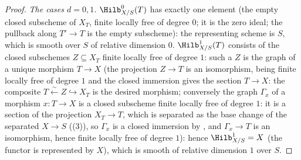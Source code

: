 \begin{proof}
\emph{The cases $d=0,1$.}  $\Hilb^0_{X/S}(T)$ has exactly one element
(the empty closed subscheme of $X_T$, finite locally free of degree
$0$; it is the zero ideal; the pullback along $T'\to T$ is the empty
subscheme): the representing scheme is $S$, which is smooth over $S$
of relative dimension $0$.  $\Hilb^1_{X/S}(T)$ consists of the closed
subschemes $Z\subseteq X_T$ finite locally free of degree $1$: such a
$Z$ is the graph of a unique morphism $T\to X$ (the projection
$Z\to T$ is an isomorphism, being finite locally free of degree $1$
and the closed immersion gives the section $T\to X$: the composite
$T\stackrel{\sim}{\leftarrow}Z\hookrightarrow X_T$ is the desired
morphism; conversely the graph $\Gamma_x$ of a morphism $x:T\to X$ is a
closed subscheme finite locally free of degree $1$: it is a section of
the projection $X_T\to T$, which is separated as the base change of the
separated $X\to S$ ((3)), so
$\Gamma_x$ is a closed immersion by
, and $\Gamma_x\to T$ is an
isomorphism, hence finite locally free of degree $1$): hence
$\Hilb^1_{X/S}=X$ (the
functor is represented by $X$), which is smooth of relative dimension
$1$ over $S$.


\end{proof}
